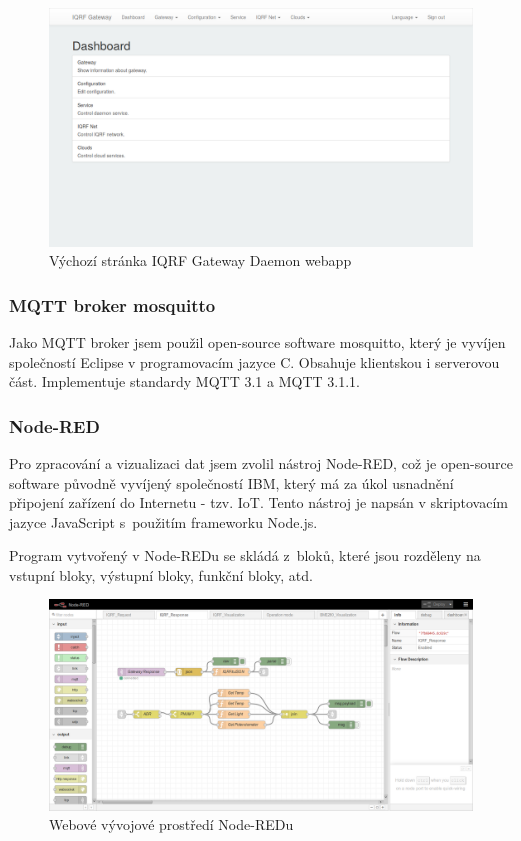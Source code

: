 \documentclass[12pt,a4paper]{article}
\begin{document}
\begin{figure}[H]
\centering
\label{fig:iqrf/iqrf-daemon-webapp}
\includegraphics[width = 150mm]{../img/iqrf/iqrf-daemon-webapp.png}
\caption{Výchozí stránka IQRF Gateway Daemon webapp}
\end{figure}

\subsubsection{MQTT broker mosquitto}

Jako MQTT broker jsem použil open-source software mosquitto\cite{sw/mosquitto}, který je vyvíjen společností Eclipse v programovacím jazyce C. Obsahuje klientskou i serverovou část. Implementuje standardy MQTT 3.1 a MQTT 3.1.1.

\newpage

\subsubsection{Node-RED}

Pro zpracování a vizualizaci dat jsem zvolil nástroj Node-RED\cite{sw/node-red}, což je open-source software původně vyvíjený společností IBM, který má za úkol usnadnění připojení zařízení do Internetu - tzv. IoT. Tento nástroj je napsán v skriptovacím jazyce JavaScript s~použitím frameworku Node.js.

Program vytvořený v Node-REDu se skládá z~bloků, které jsou rozděleny na vstupní bloky, výstupní bloky, funkční bloky, atd.

\begin{figure}[H]
\centering
\label{fig:node-red}
\includegraphics[width = 150mm]{../img/node-red.png}
\caption{Webové vývojové prostředí Node-REDu}
\end{figure}
\end{document}
